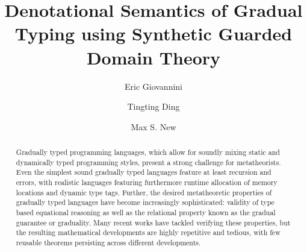 \documentclass[sigconf,anonymous,review,screen,9pt]{acmart}
\begin{document}
\title{Denotational Semantics of Gradual Typing using Synthetic Guarded Domain Theory}
\author{Eric Giovannini}

\author{Tingting Ding}

\author{Max S. New}

\begin{abstract}
  Gradually typed programming languages, which allow for soundly
  mixing static and dynamically typed programming styles, present a
  strong challenge for metatheorists. Even the simplest sound
  gradually typed languages feature at least recursion and errors,
  with realistic languages featuring furthermore runtime allocation of
  memory locations and dynamic type tags. Further, the desired
  metatheoretic properties of gradually typed languages have become
  increasingly sophisticated: validity of type based equational
  reasoning as well as the relational property known as the gradual
  guarantee or graduality. Many recent works have tackled verifying
  these properties, but the resulting mathematical developments are
  highly repetitive and tedious, with few reusable theorems persisting
  across different developments.


\end{abstract}
\end{document}
